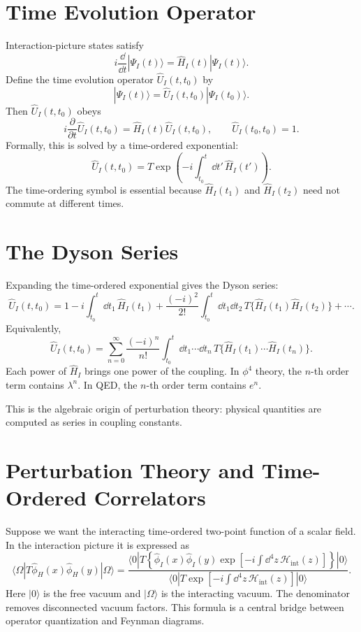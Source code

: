 \section{Time Evolution Operator}

Interaction-picture states satisfy
\[
    i\frac{\dd}{\dd t}|\Psi_I(t)\rangle
    = \hat H_I(t)|\Psi_I(t)\rangle.
\]
Define the time evolution operator \(\hat U_I(t,t_0)\) by
\[
    |\Psi_I(t)\rangle
    = \hat U_I(t,t_0)|\Psi_I(t_0)\rangle.
\]
Then \(\hat U_I(t,t_0)\) obeys
\[
    i\frac{\partial}{\partial t}\hat U_I(t,t_0)
    = \hat H_I(t)\hat U_I(t,t_0),
    \qquad
    \hat U_I(t_0,t_0)=1.
\]
Formally, this is solved by a time-ordered exponential:
\[
    \hat U_I(t,t_0)
    = T\exp\left(-i\int_{t_0}^{t}\dd t'\,\hat H_I(t')\right).
\]
The time-ordering symbol is essential because \(\hat H_I(t_1)\) and
\(\hat H_I(t_2)\) need not commute at different times.

\section{The Dyson Series}

Expanding the time-ordered exponential gives the Dyson series:
\[
    \hat U_I(t,t_0)
    = 1
      -i\int_{t_0}^{t}\dd t_1\,\hat H_I(t_1)
      +\frac{(-i)^2}{2!}\int_{t_0}^{t}\dd t_1\dd t_2\,
      T\{\hat H_I(t_1)\hat H_I(t_2)\}
      +\cdots.
\]
Equivalently,
\[
    \hat U_I(t,t_0)
    = \sum_{n=0}^{\infty}\frac{(-i)^n}{n!}
      \int_{t_0}^{t}\dd t_1\cdots\dd t_n\,
      T\{\hat H_I(t_1)\cdots\hat H_I(t_n)\}.
\]
Each power of \(\hat H_I\) brings one power of the coupling. In \(\phi^4\)
theory, the \(n\)-th order term contains \(\lambda^n\). In QED, the \(n\)-th
order term contains \(e^n\).

This is the algebraic origin of perturbation theory: physical quantities are
computed as series in coupling constants.

\section{Perturbation Theory and Time-Ordered Correlators}

Suppose we want the interacting time-ordered two-point function of a scalar
field. In the interaction picture it is expressed as
\[
    \langle\Omega|T\hat\phi_H(x)\hat\phi_H(y)|\Omega\rangle
    = \frac{
      \langle0|T\left\{\hat\phi_I(x)\hat\phi_I(y)
      \exp\left[-i\int\dd^4z\,\mathcal{H}_{\mathrm{int}}(z)\right]\right\}|0\rangle
    }{
      \langle0|T\exp\left[-i\int\dd^4z\,\mathcal{H}_{\mathrm{int}}(z)\right]|0\rangle
    }.
\]
Here \(|0\rangle\) is the free vacuum and \(|\Omega\rangle\) is the interacting
vacuum. The denominator removes disconnected vacuum factors. This formula is a
central bridge between operator quantization and Feynman diagrams.

